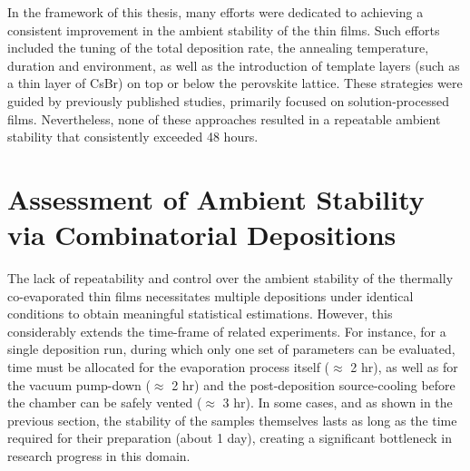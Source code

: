 In the framework of this thesis, many efforts were dedicated to achieving a consistent improvement in the ambient stability of the  thin films. Such efforts included the tuning of the total deposition rate, the annealing temperature, duration and environment, as well as the introduction of template layers (such as a thin layer of CsBr) on top or below the perovskite lattice. These strategies were guided by previously published studies, primarily focused on solution-processed films. Nevertheless, none of these approaches resulted in a repeatable ambient stability that consistently exceeded 48 hours.


\section{Assessment of Ambient Stability via Combinatorial Depositions}

The lack of repeatability and control over the ambient stability of the thermally co-evaporated  thin films necessitates multiple depositions under identical conditions to obtain meaningful statistical estimations. However, this considerably extends the time-frame of related experiments. For instance, for a single deposition run, during which only one set of parameters can be evaluated, time must be allocated for the evaporation process itself ($\approx$ 2 hr), as well as for the vacuum pump-down ($\approx$ 2 hr) and the post-deposition source-cooling before the chamber can be safely vented ($\approx$ 3 hr). In some cases, and as shown in the previous section, the stability of the samples themselves lasts as long as the time required for their preparation (about 1 day), creating a significant bottleneck in research progress in this domain.  

